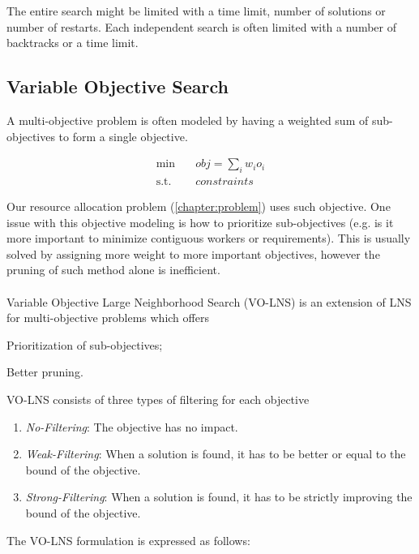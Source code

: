 \documentclass[../../thesis.tex]{subfiles}
\begin{document}
The entire search might be limited with a time limit, number of solutions or number of restarts. Each independent search 
is often limited with a number of backtracks or a time limit.

\subsection{Variable Objective Search}

A multi-objective problem is often modeled by having a weighted sum of sub-objectives to form a 
single objective. 

\begin{align*}
  \text{min} \quad & obj = \sum_{i} w_i o_i \\
  \text{s.t.} \quad & constraints
\end{align*}

Our resource allocation problem (\ref{chapter:problem}) uses such objective. One issue with this objective modeling is how 
to prioritize sub-objectives (e.g. is it more important to minimize contiguous workers or requirements). This is 
usually solved by assigning more weight to more important objectives, however the pruning of such method alone is inefficient.

\paragraph{}

Variable Objective Large Neighborhood Search (VO-LNS) \cite{Schaus:VOLNS} is an extension of LNS for multi-objective 
problems which offers
\begin{enumerate*}[label=(\roman*)]
  \item Prioritization of sub-objectives;
  \item Better pruning.
\end{enumerate*}
VO-LNS consists of three types of filtering for each objective
\begin{enumerate}
  \item \emph{No-Filtering}: The objective has no impact.
  \item \emph{Weak-Filtering}: When a solution is found, it has to be better or equal to the bound of the objective. 
  \item \emph{Strong-Filtering}: When a solution is found, it has to be strictly improving the bound of the objective.
\end{enumerate}

The VO-LNS formulation is expressed as follows:
\end{document}
